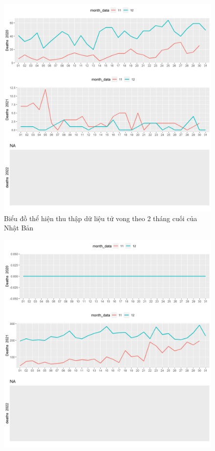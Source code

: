 \documentclass[a4paper]{article}
\theoremstyle{definition}
\begin{document}
\begin{enumerate}[i)]
\begin{enumerate}[1)]
\begin{figure}[htp]
		    \includegraphics[scale = 0.7]{Images/V/v5 Japan .jpeg}
		    \caption{Biểu đồ thể hiện thu thập dữ liệu tử vong theo 2 tháng cuối của Nhật Bản}
		    \label{fig:my_label}
		\end{figure}
		\begin{figure}[htp]
		    \centering
		    \includegraphics[scale = 0.7]{Images/V/v5 Vietnam .jpeg}

\end{figure}
\end{enumerate}
\end{enumerate}
\end{document}
